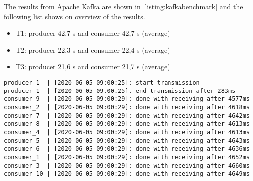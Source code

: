 The results from Apache Kafka are shown in \ref{listing:kafkabenchmark} and the following list shows on overview of the results.

\begin{itemize}
    \item T1: producer 42,7 s and consumer 42,7 s (average)
    \item T2: producer 22,3 s and consumer 22,4 s (average)
    \item T3: producer 21,6 s and consumer 21,7 s (average)
\end{itemize}

\begin{lstlisting}[caption=RabbitMQ benchmark results, label=listing:rabbitbenchmark]
producer_1  | [2020-06-05 09:00:25]: start transmission
producer_1  | [2020-06-05 09:00:25]: end transmission after 283ms
consumer_9  | [2020-06-05 09:00:29]: done with receiving after 4577ms
consumer_2  | [2020-06-05 09:00:29]: done with receiving after 4618ms
consumer_7  | [2020-06-05 09:00:29]: done with receiving after 4642ms
consumer_8  | [2020-06-05 09:00:29]: done with receiving after 4613ms
consumer_4  | [2020-06-05 09:00:29]: done with receiving after 4613ms
consumer_5  | [2020-06-05 09:00:29]: done with receiving after 4643ms
consumer_6  | [2020-06-05 09:00:29]: done with receiving after 4636ms
consumer_1  | [2020-06-05 09:00:29]: done with receiving after 4652ms
consumer_3  | [2020-06-05 09:00:29]: done with receiving after 4660ms
consumer_10 | [2020-06-05 09:00:29]: done with receiving after 4649ms
\end{lstlisting}

